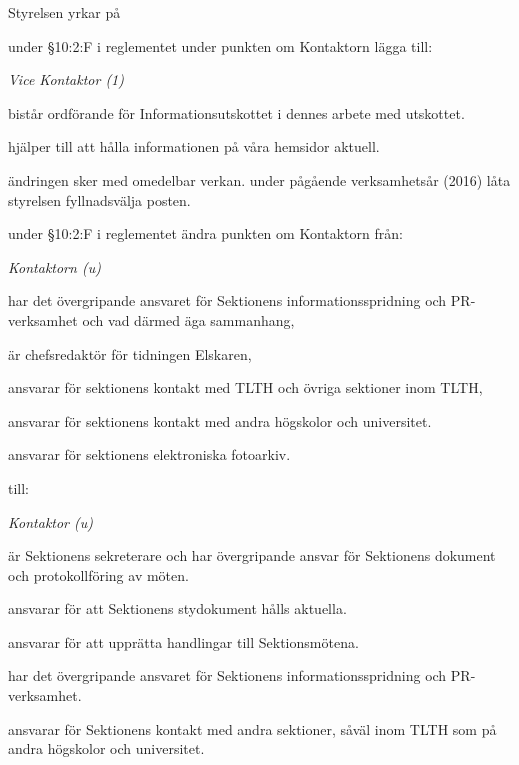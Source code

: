 \documentclass[../_main/handlingar.tex]{subfiles}
\begin{document}
Styrelsen yrkar på
\begin{attsatser}
    \att under \S10:2:F i reglementet under punkten om Kontaktorn lägga till:\par
    {\it
    Vice Kontaktor (1)
    \begin{tightdashlist}
        \item bistår ordförande för Informationsutskottet i dennes arbete med utskottet.
        \item hjälper till att hålla informationen på våra hemsidor aktuell.
    \end{tightdashlist}
    }
    \att ändringen sker med omedelbar verkan.
    \att under pågående verksamhetsår (2016) låta styrelsen fyllnadsvälja posten.

    \newpage

    \att under \S10:2:F i reglementet ändra punkten om Kontaktorn från:\par
    {\it
    Kontaktorn (u)
    \begin{tightdashlist}
        \item har det övergripande ansvaret för Sektionens informationsspridning och PR-verksamhet och vad därmed äga sammanhang,
        \item är chefsredaktör för tidningen Elskaren,
        \item ansvarar för sektionens kontakt med TLTH och övriga sektioner inom TLTH,
        \item ansvarar för sektionens kontakt med andra högskolor och universitet.
        \item ansvarar för sektionens elektroniska fotoarkiv.
    \end{tightdashlist}
    }
    till:\par
    {\it
    Kontaktor (u)
    \begin{tightdashlist}
        \item är Sektionens sekreterare och har övergripande ansvar för Sektionens dokument och protokollföring av möten.
        \item ansvarar för att Sektionens stydokument hålls aktuella.
        \item ansvarar för att upprätta handlingar till Sektionsmötena.
        \item har det övergripande ansvaret för Sektionens informationsspridning och PR-verksamhet.
        \item ansvarar för Sektionens kontakt med andra sektioner, såväl inom TLTH som på andra högskolor och universitet.
    \end{tightdashlist}
    }


\end{attsatser}
\end{document}
